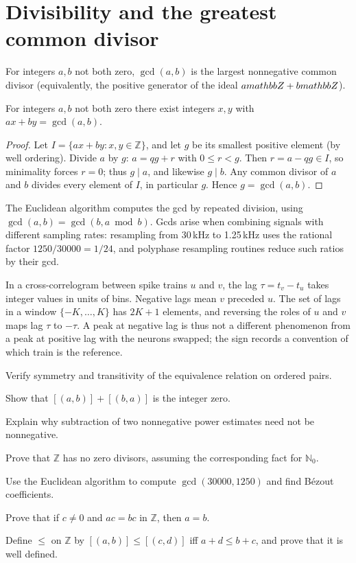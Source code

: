 \section{Divisibility and the greatest common divisor}
For integers $a,b$ not both zero, $\gcd(a,b)$ is the largest nonnegative common divisor (equivalently, the positive generator of the ideal $a\\mathbb Z+b\\mathbb Z$).

\begin{theorem}[B\'ezout]
For integers $a,b$ not both zero there exist integers $x,y$ with $ax+by=\gcd(a,b)$.
\end{theorem}
\begin{proof}
Let $I=\{ax+by:x,y\in\mathbb Z\}$, and let $g$ be its smallest positive element (by well ordering). Divide $a$ by $g$: $a=qg+r$ with $0\le r<g$. Then $r=a-qg\in I$, so minimality forces $r=0$; thus $g\mid a$, and likewise $g\mid b$. Any common divisor of $a$ and $b$ divides every element of $I$, in particular $g$. Hence $g=\gcd(a,b)$.
\end{proof}
The Euclidean algorithm computes the gcd by repeated division, using $\gcd(a,b)=\gcd(b,a\bmod b)$. Gcds arise when combining signals with different sampling rates: resampling from 30\,kHz to 1.25\,kHz uses the rational factor $1250/30000=1/24$, and polyphase resampling routines reduce such ratios by their gcd.

\begin{workedexample}
In a cross-correlogram between spike trains $u$ and $v$, the lag $\tau=t_v-t_u$ takes integer values in units of bins. Negative lags mean $v$ preceded $u$. The set of lags in a window $\{-K,\ldots,K\}$ has $2K+1$ elements, and reversing the roles of $u$ and $v$ maps lag $\tau$ to $-\tau$. A peak at negative lag is thus not a different phenomenon from a peak at positive lag with the neurons swapped; the sign records a convention of which train is the reference.
\end{workedexample}
\begin{exercises}
\item Verify symmetry and transitivity of the equivalence relation on ordered pairs.
\item Show that $[(a,b)]+[(b,a)]$ is the integer zero.
\item Explain why subtraction of two nonnegative power estimates need not be nonnegative.
\item Prove that $\mathbb Z$ has no zero divisors, assuming the corresponding fact for $\mathbb N_0$.
\item Use the Euclidean algorithm to compute $\gcd(30000,1250)$ and find B\'ezout coefficients.
\item Prove that if $c\ne0$ and $ac=bc$ in $\mathbb Z$, then $a=b$.
\item Define $\le$ on $\mathbb Z$ by $[(a,b)]\le[(c,d)]$ iff $a+d\le b+c$, and prove that it is well defined.
\end{exercises}
